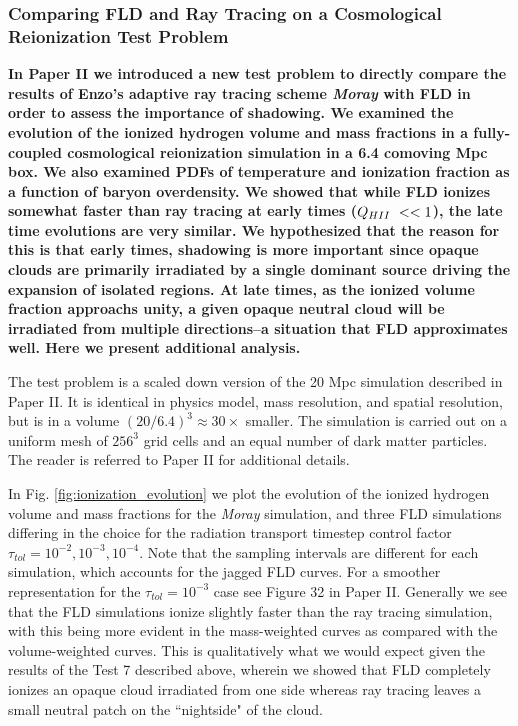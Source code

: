 \subsubsection{Comparing FLD and Ray Tracing on a Cosmological Reionization Test Problem}
{\bf In  Paper II we introduced a new test problem to directly compare the results of Enzo's adaptive ray tracing scheme {\em Moray} with FLD in order to assess the importance of shadowing. We examined the evolution of the ionized hydrogen volume and mass fractions in a fully-coupled cosmological reionization simulation in a 6.4 comoving Mpc box. We also examined PDFs of temperature and ionization fraction as a function of baryon overdensity. We showed that while FLD ionizes somewhat faster than ray tracing at early times ($Q_{\hii}<<1$), the late time evolutions are very similar. We hypothesized that the reason for this is that early times, shadowing is more important since opaque clouds are primarily irradiated by a single dominant source driving the expansion of isolated \hii regions. At late times, as the ionized volume fraction approachs unity, a given opaque neutral cloud will be irradiated from multiple directions--a situation that FLD approximates well. Here we present additional analysis. 

The test problem is a scaled down version of the 20 Mpc simulation described in Paper II. It is identical in physics model, mass resolution, and spatial resolution, but is in a volume $(20/6.4)^3 \approx 30\times$ smaller. The simulation is carried out on a uniform mesh of $256^3$ grid cells and an equal number of dark matter particles. The reader is referred to Paper II for additional details.

In Fig. \ref{fig:ionization_evolution} we plot the evolution of the ionized hydrogen volume and mass fractions for the {\em Moray} simulation, and three FLD simulations differing in the choice for the radiation transport timestep control factor $\tau_{tol} = 10^{-2}, 10^{-3}, 10^{-4}.$ Note that the sampling intervals are different for each simulation, which accounts for the jagged FLD curves. For a smoother representation for the $\tau_{tol} = 10^{-3}$ case see Figure 32 in Paper II. Generally we see that the FLD simulations ionize slightly faster than the ray tracing simulation, with this being more evident in the mass-weighted curves as compared with the volume-weighted curves. This is qualitatively what we would expect given the results of the Test 7 described above, wherein we showed that FLD completely ionizes an opaque cloud irradiated from one side whereas ray tracing leaves a small neutral patch on the ``nightside" of the cloud. 

}
